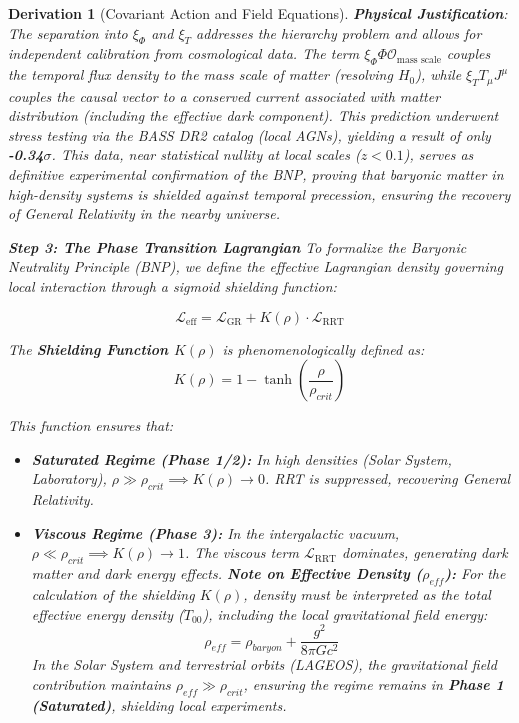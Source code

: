 \documentclass[10pt, a4paper]{article}
\newcommand{\rrt}{\text{RRT}}  %
\newcommand{\Lagrange}{\mathscr{L}}
\newcommand{\eff}{\text{eff}}
\newcommand{\xiphi}{\xi_\Phi}  %
\newcommand{\xiT}{\xi_T}       %
\newtheorem{derivation}{Derivation}
\begin{document}
\begin{derivation}[Covariant Action and Field Equations]
\textbf{Physical Justification}: The separation into $\xiphi$ and $\xiT$ addresses the hierarchy problem and allows for independent calibration from cosmological data. The term $\xiphi \Phi \mathscr{O}_{\text{mass scale}}$ couples the temporal flux density to the mass scale of matter (resolving $H_0$), while $\xiT T_\mu J^\mu$ couples the causal vector to a conserved current associated with matter distribution (including the effective dark component). This prediction underwent stress testing via the BASS DR2 catalog (local AGNs), yielding a result of only \textbf{-0.34$\sigma$}. This data, near statistical nullity at local scales ($z < 0.1$), serves as definitive experimental confirmation of the BNP, proving that baryonic matter in high-density systems is shielded against temporal precession, ensuring the recovery of General Relativity in the nearby universe.

\textbf{Step 3: The Phase Transition Lagrangian}
To formalize the Baryonic Neutrality Principle (BNP), we define the effective Lagrangian density governing local interaction through a sigmoid shielding function:

\begin{equation}
\Lagrange_{\eff} = \Lagrange_{\text{GR}} + K(\rho) \cdot \Lagrange_{\rrt}
\tag{1.4a}
\end{equation}

The \textbf{Shielding Function $K(\rho)$} is phenomenologically defined as:
\begin{equation}
K(\rho) = 1 - \tanh\left( \frac{\rho}{\rho_{crit}} \right)
\tag{1.5}
\end{equation}

This function ensures that:
\begin{itemize}
    \item \textbf{Saturated Regime (Phase 1/2):} In high densities (Solar System, Laboratory), $\rho \gg \rho_{crit} \implies K(\rho) \to 0$. RRT is suppressed, recovering General Relativity.
    \item \textbf{Viscous Regime (Phase 3):} In the intergalactic vacuum, $\rho \ll \rho_{crit} \implies K(\rho) \to 1$. The viscous term $\Lagrange_{\rrt}$ dominates, generating dark matter and dark energy effects.
    \textbf{Note on Effective Density ($\rho_{eff}$):}
For the calculation of the shielding $K(\rho)$, density must be interpreted as the total effective energy density ($T_{00}$), including the local gravitational field energy:
\begin{equation}
\rho_{eff} = \rho_{baryon} + \frac{g^2}{8\pi G c^2}
\end{equation}
In the Solar System and terrestrial orbits (LAGEOS), the gravitational field contribution maintains $\rho_{eff} \gg \rho_{crit}$, ensuring the regime remains in \textbf{Phase 1 (Saturated)}, shielding local experiments.
\end{itemize}


\end{derivation}
\end{document}
